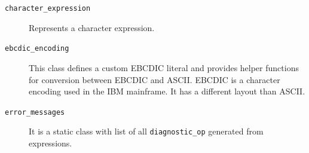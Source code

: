 \begin{description}
	\item[\texttt{character\_expression}] Represents a character expression.
	
	\item[\texttt{ebcdic\_encoding}] This class defines a custom EBCDIC literal and provides helper functions for conversion between EBCDIC and ASCII. EBCDIC is a character encoding used in the IBM mainframe. It has a different layout than ASCII.
	
	\item[\texttt{error\_messages}] It is a static class with list of all \texttt{diagnostic\_op} generated from expressions.
	
	
\end{description}

